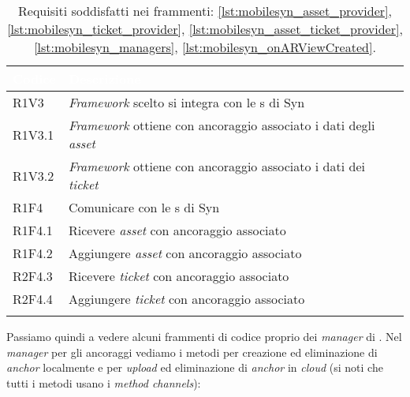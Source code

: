 {
    \setlength{\freewidth}{\dimexpr\textwidth-10\tabcolsep}
    \renewcommand{\arraystretch}{1.5}
    \centering
    \setlength{\aboverulesep}{0pt}
    \setlength{\belowrulesep}{0pt}
    \begin{longtable}{C{.15\freewidth} C{1\freewidth}}
       \toprule
    \textcolor{white}{\textbf{Codice}}&
    \textcolor{white}{\textbf{Descrizione}}\\
    \toprule
    \endhead

    R1V3 & \textit{Framework} scelto si integra con le \api{}s di Syn\\
    R1V3.1 & \textit{Framework} ottiene con ancoraggio associato i dati degli \textit{asset}\\
    R1V3.2 & \textit{Framework} ottiene con ancoraggio associato i dati dei \textit{ticket}\\ 
    R1F4 & Comunicare con le \api{}s di Syn\\
    R1F4.1 & Ricevere \textit{asset} con ancoraggio associato\\
    R1F4.2 & Aggiungere \textit{asset} con ancoraggio associato\\
    R2F4.3 & Ricevere \textit{ticket} con ancoraggio associato\\
    R2F4.4 & Aggiungere \textit{ticket} con ancoraggio associato\\
  
    \bottomrule
    \caption{Requisiti soddisfatti nei frammenti: \ref{lst:mobilesyn_asset_provider}, \ref{lst:mobilesyn_ticket_provider}, \ref{lst:mobilesyn_asset_ticket_provider}, \ref{lst:mobilesyn_managers}, \ref{lst:mobilesyn_onARViewCreated}.}
    \end{longtable}
}

Passiamo quindi a vedere alcuni frammenti di codice proprio dei \textit{manager} di \aplug{}.
Nel \textit{manager} per gli ancoraggi vediamo i metodi per creazione ed eliminazione di \textit{anchor} localmente e per \textit{upload} ed eliminazione di \textit{anchor} in \textit{cloud} (si noti che tutti i metodi usano i \textit{method channels}): 

